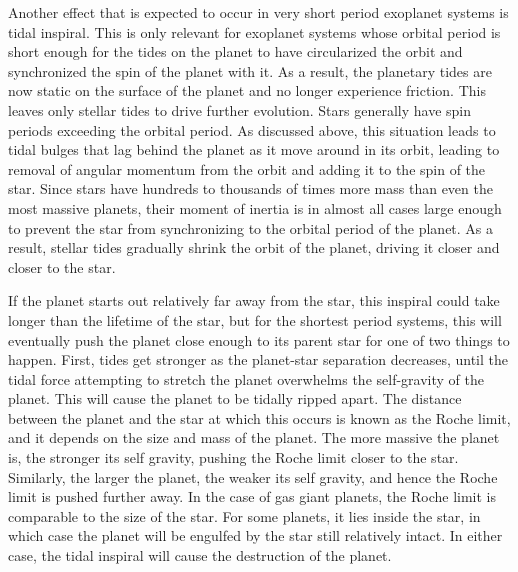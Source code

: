 Another effect that is expected to occur in very short period exoplanet systems
is tidal inspiral. This is only relevant for exoplanet systems whose orbital
period is short enough for the tides on the planet to have circularized the
orbit and synchronized the spin of the planet with it. As a result, the
planetary tides are now static on the surface of the planet and no longer
experience friction. This leaves only stellar tides to drive further evolution.
Stars generally have spin periods exceeding the orbital period. As discussed
above, this situation leads to tidal bulges that lag behind the planet as it
move around in its orbit, leading to removal of angular momentum from the orbit
and adding it to the spin of the star. Since stars have hundreds to thousands of
times more mass than even the most massive planets, their moment of inertia is
in almost all cases large enough to prevent the star from synchronizing to the
orbital period of the planet. As a result, stellar tides gradually shrink the
orbit of the planet, driving it closer and closer to the star.

If the planet starts out relatively far away from the star, this inspiral could
take longer than the lifetime of the star, but for the shortest period systems,
this will eventually push the planet close enough to its parent star for one of
two things to happen. First, tides get stronger as the planet-star separation
decreases, until the tidal force attempting to stretch the planet overwhelms the
self-gravity of the planet. This will cause the planet to be tidally ripped
apart. The distance between the planet and the star at which this occurs is
known as the Roche limit, and it depends on the size and mass of the planet. The
more massive the planet is, the stronger its self gravity, pushing the Roche
limit closer to the star.  Similarly, the larger the planet, the weaker its self
gravity, and hence the Roche limit is pushed further away. In the case of gas
giant planets, the Roche limit is comparable to the size of the star. For some
planets, it lies inside the star, in which case the planet will be engulfed by
the star still relatively intact. In either case, the tidal inspiral will cause
the destruction of the planet.

